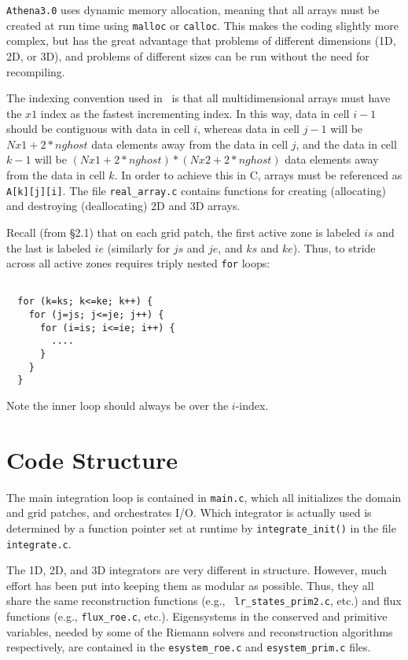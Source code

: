 {\tt Athena3.0} uses dynamic memory allocation, meaning that all arrays must be
created at run time using {\tt malloc} or {\tt calloc}.  This makes the
coding slightly more complex, but has the great advantage that problems
of different dimensions (1D, 2D, or 3D), and problems of different sizes
can be run without the need for recompiling.

The indexing convention used in \ath\ is that all multidimensional
arrays must have the $x1$ index as the fastest incrementing index.
In this way, data in cell $i-1$ should be contiguous with data in cell
$i$, whereas data in cell $j-1$ will be $Nx1 + 2*nghost$ data elements
away from the data in cell $j$, and the data in cell $k-1$ will be
$(Nx1 + 2*nghost)*(Nx2 + 2*nghost)$ data elements away from the data in
cell $k$.  In order to achieve this in C, arrays must be referenced as
{\tt A[k][j][i]}.  The file {\tt real\_array.c} contains functions for
creating (allocating) and destroying (deallocating) 2D and 3D arrays.

Recall (from \S2.1) that on each grid patch, the first active zone is
labeled $is$ and the last is labeled $ie$ (similarly for $js$ and $je$, 
and $ks$ and $ke$).  Thus, to stride across all active zones requires
triply nested {\tt for} loops:
\footnotesize
\begin{verbatim}

  for (k=ks; k<=ke; k++) {
    for (j=js; j<=je; j++) {
      for (i=is; i<=ie; i++) {
        ....
      }
    }
  }

\end{verbatim}
\normalsize
Note the inner loop should always be over the $i$-index.

\section{Code Structure}

The main integration loop is contained in {\tt main.c}, which all
initializes the domain and grid patches, and orchestrates I/O.  Which
integrator is actually used is determined by a function pointer
set at runtime by {\tt integrate\_init()} in the file {\tt integrate.c}.

The 1D, 2D, and 3D integrators are very different in structure.
However, much effort has been put into keeping them as modular as
possible.  Thus, they all share the same reconstruction functions (e.g., {\tt
lr\_states\_prim2.c}, etc.) and flux functions (e.g., {\tt flux\_roe.c},
etc.).  Eigensystems in the conserved and primitive variables, needed by
some of the Riemann solvers and reconstruction algorithms respectively,
are contained in the {\tt esystem\_roe.c} and {\tt esystem\_prim.c} files.

